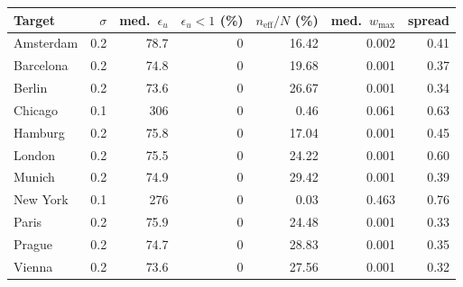 \begin{tabular}{lrrrrrr}
\toprule
Target & $\sigma$ & med.\ $\epsilon_u$ & $\epsilon_u{<}1$ (\%) & $n_{\mathrm{eff}}/N$ (\%) & med.\ $w_{\max}$ & spread \\
\midrule
Amsterdam & 0.2 & 78.7 & 0 & 16.42 & 0.002 & 0.41 \\
Barcelona & 0.2 & 74.8 & 0 & 19.68 & 0.001 & 0.37 \\
Berlin & 0.2 & 73.6 & 0 & 26.67 & 0.001 & 0.34 \\
Chicago & 0.1 & 306 & 0 & 0.46 & 0.061 & 0.63 \\
Hamburg & 0.2 & 75.8 & 0 & 17.04 & 0.001 & 0.45 \\
London & 0.2 & 75.5 & 0 & 24.22 & 0.001 & 0.60 \\
Munich & 0.2 & 74.9 & 0 & 29.42 & 0.001 & 0.39 \\
New York & 0.1 & 276 & 0 & 0.03 & 0.463 & 0.76 \\
Paris & 0.2 & 75.9 & 0 & 24.48 & 0.001 & 0.33 \\
Prague & 0.2 & 74.7 & 0 & 28.83 & 0.001 & 0.35 \\
Vienna & 0.2 & 73.6 & 0 & 27.56 & 0.001 & 0.32 \\
\bottomrule
\end{tabular}
